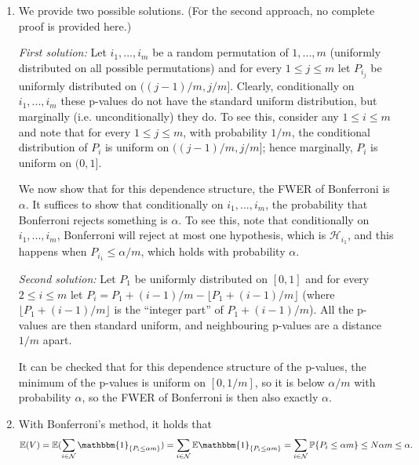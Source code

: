 \documentclass[11pt]{article}
\theoremstyle{plain}
\theoremstyle{definition}
\newcommand{\N}{\mathcal{N}}
\newcommand{\Hy}{\mathcal{H}}
\newcommand{\pr}{\mathbb{P}}
\begin{document}
\begin{sols}
\begin{enumerate}
$$  \frac{\alpha}{
  -      \frac{\log(1-\alpha)^1}{1!} -  \frac{1/m(\log(1-\alpha))^2}{2!}...  }=$$
  $$  \frac{\alpha}{
  -      \frac{\log(1-\alpha)^1}{1!} +o(m)  }.$$
  As $m\rightarrow\infty$, this converges to 
  $\alpha/(-\log(1-\alpha))$.




\item
We provide two possible solutions. (For the second approach, no complete proof is provided here.)

\emph{First solution:}
Let $i_1,...,i_m$ be a random permutation of $1,...,m$ (uniformly distributed on all possible permutations) and for every $1\leq j \leq m$ let $P_{i_j}$ be uniformly distributed on $((j-1)/m, j/m]$. Clearly, conditionally on $i_1,...,i_m$ these p-values do not have the standard uniform distribution, but marginally (i.e. unconditionally) they do. To see this, consider any $1\leq i \leq m$ and note that for every $1\leq j \leq m$, with probability $1/m$, the conditional distribution of $P_i$ is uniform on $((j-1)/m, j/m]$; hence marginally, $P_i$ is uniform on $(0,1]$.

We now show that for this dependence structure, the FWER of Bonferroni is $\alpha$.
It suffices to show that conditionally on $i_1,...,i_m$, the probability that Bonferroni rejects something is $\alpha$.
To see this, note that conditionally on $i_1,...,i_m$,  Bonferroni will reject at most one hypothesis, which is $\Hy_{i_1}$, and this happens when $P_{i_1}\leq \alpha/m$, which holds with probability $\alpha$.

\emph{Second solution:}
Let $P_1$ be uniformly distributed on $[0,1]$ and for every $2\leq i \leq m$ let $P_i=P_1+(i-1)/m - \lfloor P_1+(i-1)/m \rfloor$ (where $\lfloor P_1+(i-1)/m \rfloor$ is the ``integer part'' of  $P_1+(i-1)/m$).
All the p-values are then standard uniform, and neighbouring p-values  are a distance $1/m$ apart. 


It can be checked that for this dependence structure of the p-values, the minimum of the p-values is uniform on $[0,1/m]$, so it is below $\alpha/m$ with probability  $\alpha$, so  the FWER of Bonferroni is then also exactly $\alpha$.









\item 
With Bonferroni's method, it holds that 
$$\mathbb{E}(V) = \mathbb{E}(\sum_{i\in \N}\mathbbm{1}_{\{P_i\leq \alpha m\}})= \sum_{i\in \N} \mathbb{E}\mathbbm{1}_{\{P_i\leq \alpha m\}}=\sum_{i\in \N} \pr\{P_i\leq \alpha m\} \leq N\alpha m\leq \alpha.$$


\end{enumerate}
\end{sols}
\end{document}
